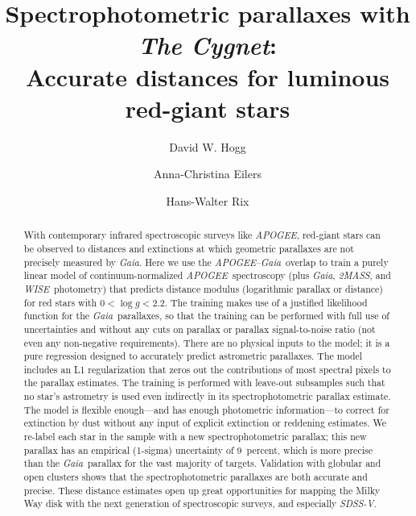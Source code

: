\documentclass[modern]{aastex62}
\newcommand{\acronym}[1]{{\small{#1}}}
\newcommand{\project}[1]{\textsl{#1}}
\newcommand{\apogee}{\project{\acronym{APOGEE}}}
\newcommand{\gaia}{\project{Gaia}}
\newcommand{\wise}{\project{\acronym{WISE}}}
\newcommand{\zmass}{\project{\acronym{2MASS}}}
\newcommand{\sdssv}{\project{\acronym{SDSS-V}}}
\newcommand{\logg}{\log g}
\begin{document}
\sloppy\sloppypar\raggedbottom\frenchspacing %

\title{\textbf{%
Spectrophotometric parallaxes with \project{The Cygnet}:\\
Accurate distances for luminous red-giant stars
}}

\author[0000-0003-2866-9403]{David W. Hogg}

\author[0000-0003-2895-6218]{Anna-Christina Eilers}

\author[0000-0003-4996-9069]{Hans-Walter Rix}

\begin{abstract}\noindent
With contemporary infrared spectroscopic surveys like \apogee,
red-giant stars can be observed to distances and extinctions
at which geometric parallaxes are not precisely measured by \gaia.
Here we use the \apogee--\gaia\ overlap to train a purely linear model of
continuum-normalized \apogee\ spectroscopy
(plus \gaia, \zmass, and \wise\ photometry)
that predicts distance modulus (logarithmic parallax or distance)
for red stars with $0<\logg<2.2$.
The training makes use of a justified likelihood function for the \gaia\ parallaxes,
so that the training can be performed with full use of uncertainties and
without any cuts on parallax or parallax signal-to-noise ratio (not even any non-negative
requirements).
There are no physical inputs to the model; it is a pure regression designed
to accurately predict astrometric parallaxes.
The model includes an L1 regularization that zeros out the contributions of
most spectral pixels to the parallax estimates.
The training is performed
with leave-out subsamples such that no star's astrometry is used even indirectly in its
spectrophotometric parallax estimate.
The model is flexible enough---and has enough photometric information---to
correct for extinction by dust without any
input of explicit extinction or reddening estimates.
We re-label each star in the sample
with a new spectrophotometric parallax; this new parallax has an empirical (1-sigma)
uncertainty of 9~percent, which is more precise than the \gaia\ parallax
for the vast majority of targets.
Validation with globular and open clusters shows that the spectrophotometric parallaxes
are both accurate and precise.
These distance estimates open up great opportunities for
mapping the Milky Way disk with the next
generation of spectroscopic surveys, and especially \sdssv.
\end{abstract}
\end{document}
